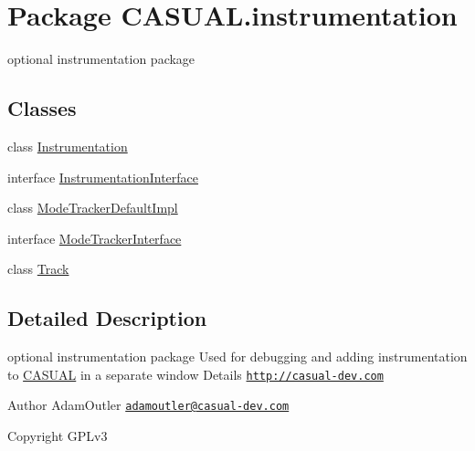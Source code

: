\hypertarget{namespace_c_a_s_u_a_l_1_1instrumentation}{\section{Package C\-A\-S\-U\-A\-L.\-instrumentation}
\label{namespace_c_a_s_u_a_l_1_1instrumentation}
}


optional instrumentation package  


\subsection*{Classes}
\begin{DoxyCompactItemize}
\item 
class \hyperlink{class_c_a_s_u_a_l_1_1instrumentation_1_1_instrumentation}{Instrumentation}
\item 
interface \hyperlink{interface_c_a_s_u_a_l_1_1instrumentation_1_1_instrumentation_interface}{Instrumentation\-Interface}
\item 
class \hyperlink{class_c_a_s_u_a_l_1_1instrumentation_1_1_mode_tracker_default_impl}{Mode\-Tracker\-Default\-Impl}
\item 
interface \hyperlink{interface_c_a_s_u_a_l_1_1instrumentation_1_1_mode_tracker_interface}{Mode\-Tracker\-Interface}
\item 
class \hyperlink{class_c_a_s_u_a_l_1_1instrumentation_1_1_track}{Track}
\end{DoxyCompactItemize}


\subsection{Detailed Description}
optional instrumentation package Used for debugging and adding instrumentation to \hyperlink{namespace_c_a_s_u_a_l}{C\-A\-S\-U\-A\-L} in a separate window Details \href{http://casual-dev.com}{\tt http\-://casual-\/dev.\-com} \begin{DoxyAuthor}{Author}
Adam\-Outler \href{mailto:adamoutler@casual-dev.com}{\tt adamoutler@casual-\/dev.\-com} 
\end{DoxyAuthor}
\begin{DoxyCopyright}{Copyright}
G\-P\-Lv3 
\end{DoxyCopyright}
